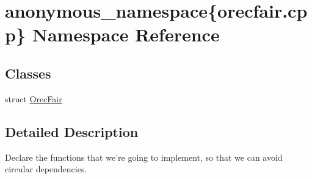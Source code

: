 \hypertarget{namespaceanonymous__namespace_02orecfair_8cpp_03}{\section{anonymous\-\_\-namespace\{orecfair.\-cpp\} Namespace Reference}
\label{namespaceanonymous__namespace_02orecfair_8cpp_03}
}
\subsection*{Classes}
\begin{DoxyCompactItemize}
\item 
struct \hyperlink{structanonymous__namespace_02orecfair_8cpp_03_1_1OrecFair}{Orec\-Fair}
\end{DoxyCompactItemize}


\subsection{Detailed Description}
Declare the functions that we're going to implement, so that we can avoid circular dependencies. 